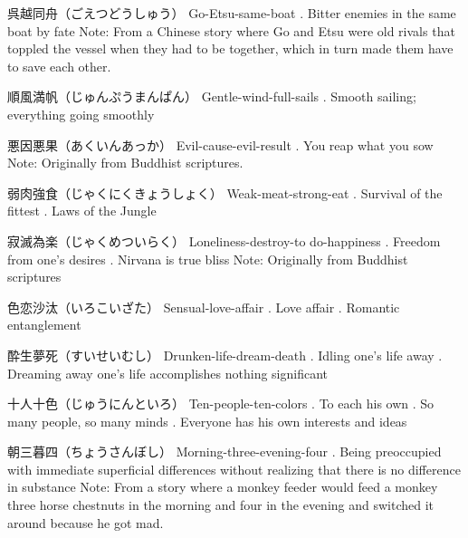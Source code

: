 \par{呉越同舟（ごえつどうしゅう） \hfill\break
Go-Etsu-same-boat \hfill{}. Bitter enemies in the same boat by fate \hfill\break
Note: From a Chinese story where Go and Etsu were old rivals that toppled the vessel when they had to be together, which in turn made them have to save each other. }

\par{順風満帆（じゅんぷうまんぱん） \hfill\break
Gentle-wind-full-sails \hfill{}. Smooth sailing; everything going smoothly }

\par{悪因悪果（あくいんあっか） \hfill\break
Evil-cause-evil-result \hfill{}. You reap what you sow \hfill\break
Note: Originally from Buddhist scriptures. }

\par{弱肉強食（じゃくにくきょうしょく） \hfill\break
Weak-meat-strong-eat \hfill{}. Survival of the fittest \hfill{}. Laws of the Jungle }

\par{寂滅為楽（じゃくめついらく） \hfill\break
Loneliness-destroy-to do-happiness \hfill{}. Freedom from one's desires \hfill{}. Nirvana is true bliss \hfill\break
Note: Originally from Buddhist scriptures }

\par{色恋沙汰（いろこいざた） \hfill\break
Sensual-love-affair \hfill{}. Love affair \hfill{}. Romantic entanglement }

\par{酔生夢死（すいせいむし） \hfill\break
Drunken-life-dream-death \hfill{}. Idling one's life away \hfill{}. Dreaming away one's life accomplishes nothing significant }

\par{十人十色（じゅうにんといろ） \hfill\break
Ten-people-ten-colors \hfill{}. To each his own \hfill{}. So many people, so many minds \hfill{}. Everyone has his own interests and ideas }

\par{朝三暮四（ちょうさんぼし） \hfill\break
Morning-three-evening-four \hfill{}. Being preoccupied with immediate superficial differences without realizing that there is no difference in substance \hfill\break
Note: From a story where a monkey feeder would feed a monkey three horse chestnuts in the morning and four in the evening and switched it around because he got mad. }

